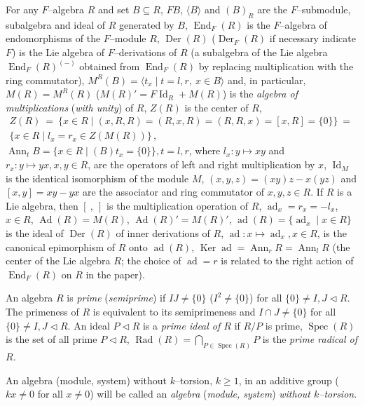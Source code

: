 \documentclass[a4paper,11pt]{article}
\DeclareMathOperator{\ad}{ad}
\DeclareMathOperator{\Ad}{Ad}
\DeclareMathOperator{\prr}{Rad}
\DeclareMathOperator{\Spec}{Spec}
\DeclareMathOperator{\Id}{Id}
\DeclareMathOperator{\Ker}{Ker}
\DeclareMathOperator{\End}{End}
\DeclareMathOperator{\Der}{Der}
\DeclareMathOperator{\Ann}{Ann}
\begin{document}
For any $F$--algebra $R$ and set ${B\subseteq R}$, $F B$, $\langle B\rangle$ 
and $(B)_R$ are the $F$--submodule, subalgebra and ideal of $R$ generated by 
$B$, $\End_F(R)$ is the $F$--algebra of endomorphisms of the 
$F$--module $R$, $\Der(R)$ ($\Der_F(R)$ if necessary indicate $F$) is the Lie 
algebra of $F$--derivations of $R$ (a subalgebra of the Lie algebra 
$\End_F(R)^{(-)}$ obtained from $\End_F(R)$ by replacing multiplication with 
the ring commutator), ${M^R(B)=\langle t_x\mid t=l, r,\ x\in B\rangle}$ and, 
in particular, ${M(R)=M^R(R)}$ (${M(R)'=F \Id_R+M(R)}$) is the \emph{algebra of 
multiplications} (\emph{with unity}) of $R$, $Z(R)$ is the center of $R$, 
\begin{multline*}
Z(R)\ =\ \{x\in R\mid (x, R, R)=(R, x, R)=(R, R, x)=[x, R]=\{0\}\}\ =\ 
\\
\{x\in R\mid l_x=r_x\in Z(M(R))\}\,,
\end{multline*}
${\Ann_t B=\{x\in R\mid (B)t_x=\{0\}\}, t=l, r}$, where 
${l_x: y\longmapsto x y}$ and ${r_x: y\longmapsto y x, x, y\in R}$, are the 
operators of left and right multiplication by $x$, $\Id_M$ is the identical 
isomorphism of the module $M$, ${(x, y, z)=(x y) z-x (y z)}$ and 
${[x, y]=x y-y x}$ are the associator and ring commutator of ${x, y, z\in R}$. 
If $R$ is a Lie algebra, then ${[\ ,\ ]}$ is the multiplication operation of 
$R$, ${\ad_x=r_x=-l_x}$, ${x\in R}$, ${\Ad(R)=M(R)}$, ${\Ad(R)'=M(R)'}$, 
${\ad(R)=\{\ad_x\mid x\in R\}}$ is the ideal of $\Der(R)$ of inner derivations 
of $R$, ${\ad: x\longmapsto \ad_x, x\in R}$, is the canonical epimorphism of 
$R$ onto $\ad(R)$, ${\Ker \ad=\Ann_r R=\Ann_l R}$ (the center of the Lie 
algebra $R$; the choice of ${\ad=r}$ is related to the right action of 
$\End_F(R)$ on $R$ in the paper).  

An algebra $R$ is \emph{prime} (\emph{semiprime}) if ${I J\ne \{0\}}$ 
(${I^2\ne \{0\}}$) for all ${\{0\}\ne I, J\lhd R}$. The primeness of $R$ is 
equivalent to its semiprimeness and ${I\cap J\ne \{0\}}$ for all  
${\{0\}\ne I, J\lhd R}$. An ideal ${P\lhd R}$ is a \emph{prime ideal of $R$} 
if $R/P$ is prime, $\Spec(R)$ is the set of all prime ${P\lhd R}$, 
${\prr(R)=\bigcap\limits_{P\in \Spec(R)} P}$ is the \emph{prime radical of $R$}. 

An algebra (module, system) without $k$--torsion, ${k\geq 1}$, in an 
additive group (${k x\ne 0}$ for all ${x\ne 0}$) will be called an 
\emph{algebra} (\emph{module, system}) \emph{without $k$--torsion}.
\end{document}
